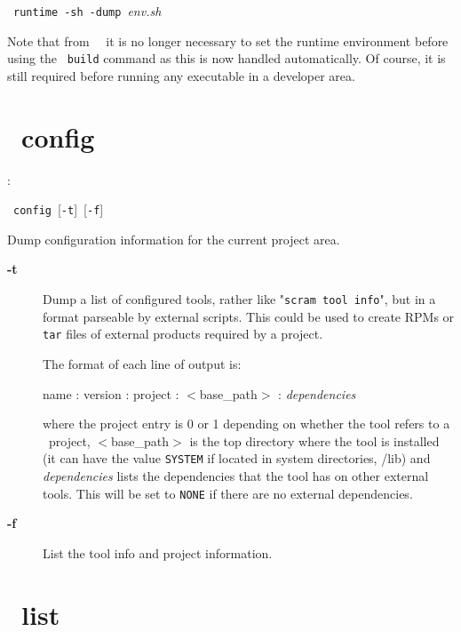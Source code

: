 \hspace{5mm}\scram~\texttt{runtime}~\texttt{-sh}~\texttt{-dump}~\textit{env.sh}

\ni Note that from \scram\ \thisrelease\ it is no longer necessary to
set the runtime environment before using the \scram~\texttt{build}
command as this is now handled automatically. Of course, it is still
required before running any executable in a developer area.

\section{\scram\ config}

\cmdintro:

\hspace{5mm}\scram~\texttt{config}~[\texttt{-t}]~[\texttt{-f}]

\ni Dump configuration information for the current project area.

\begin{description}
\item[\textbf{-t}]
  Dump a list of configured tools, rather like "\texttt{scram tool info}", but
  in a format parseable by external scripts. This could be used to
  create RPMs or \texttt{tar} files of external products required by a project.
  
  \ni The format of each line of output is:

  \hspace{5mm} \textsf{name} : \textsf{version} : \textsf{project} : $<$\textsf{base\_path}$>$ : \textit{dependencies}
  
  \ni where the \textsf{project} entry is 0 or 1 depending on whether the
  tool refers to a \scram\ project, $<$\textsf{base\_path}$>$ is the top
  directory where the tool is installed (it can have the value
  \texttt{SYSTEM} if located in system directories, \eg /lib) and
  \textit{dependencies} lists the dependencies that the tool has on
  other external tools. This will be set to \texttt{NONE} if there are 
  no external dependencies.\\
  
\item[\textbf{-f}]
  List the tool info and project information.
\end{description}

\section{\scram\ list}

